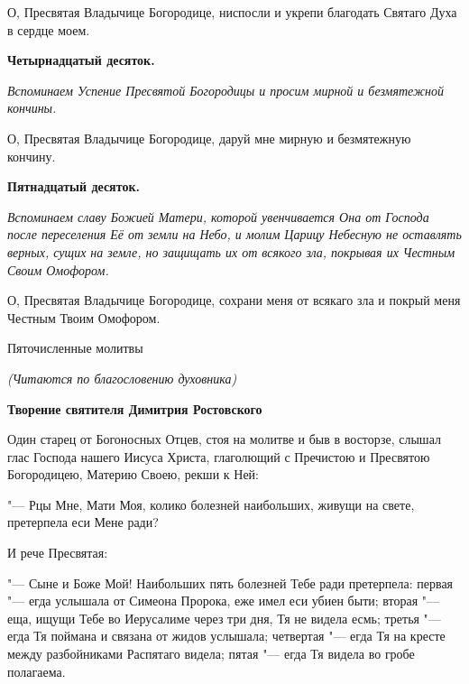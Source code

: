 \normalfont{}О, Пресвятая Владычице Богородице, ниспосли и укрепи благодать Святаго Духа в сердце моем.


\medskip


\bfseries Четырнадцатый десяток.\normalfont{}\nopagebreak


\itshape Вспоминаем Успение Пресвятой Богородицы и просим мирной и безмятежной кончины.

\normalfont{}О, Пресвятая Владычице Богородице, даруй мне мирную и безмятежную кончину.


\medskip


\bfseries Пятнадцатый десяток.\normalfont{}\nopagebreak


\itshape Вспоминаем славу Божией Матери, которой увенчивается Она от Господа после переселения Её от земли на Небо, и молим Царицу Небесную не оставлять верных, сущих на земле, но защищать их от всякого зла, покрывая их Честным Своим Омофором.

\normalfont{}О, Пресвятая Владычице Богородице, сохрани меня от всякаго зла и покрый меня Честным Твоим Омофором.


\bigskip\bigskip\mychapterending

 

Пяточисленные молитвы 

\itshape (Читаются по благословению духовника)\normalfont{}


\medskip


\bfseries Творение святителя Димитрия Ростовского\normalfont{}\nopagebreak


Один старец от Богоносных Отцев, стоя на молитве и быв в восторзе, слышал глас Господа нашего Иисуса Христа, глаголющий с Пречистою и Пресвятою Богородицею, Материю Своею, рекши к Ней: 


"--- Рцы Мне, Мати Моя, колико болезней наибольших, живущи на свете, претерпела еси Мене ради?


И рече Пресвятая:


"--- Сыне и Боже Мой! Наибольших пять болезней Тебе ради претерпела: первая "--- егда услышала от Симеона Пророка, еже имел еси убиен быти; вторая "--- еща, ищущи Тебе во Иерусалиме через три дня, Тя не видела есмь; третья "--- егда Тя поймана и связана от жидов услышала; четвертая "--- егда Тя на кресте между разбойниками Распятаго видела; пятая "--- егда Тя видела во гробе полагаема.



